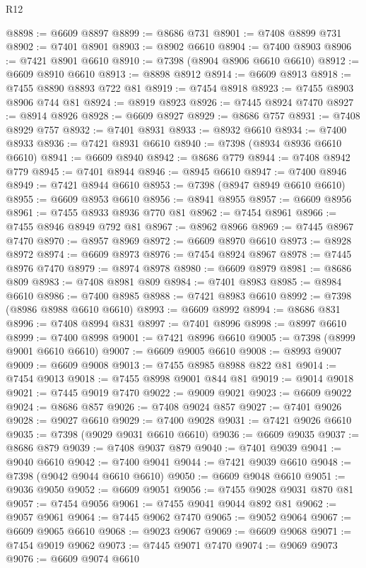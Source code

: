 \begin{lexlean}{R12}
\begin{coremodule}
{{{{{{{{{{{{{{{{{{{{{{{{{{{{{{{{{{{{{{{{{{{{{{{{{{{{{{{{{{{{{{{{{{{{{{{{{{{{{{{{{{@8898 := @6609 @8897
@8899 := @8686 @731
@8901 := @7408 @8899 @731
@8902 := @7401 @8901
@8903 := @8902 @6610
@8904 := @7400 @8903
@8906 := @7421 @8901 @6610
@8910 := @7398 (@8904 @8906 @6610 @6610)
@8912 := @6609 @8910 @6610
@8913 := @8898 @8912
@8914 := @6609 @8913
@8918 := @7455 @8890 @8893 @722 @81
@8919 := @7454 @8918
@8923 := @7455 @8903 @8906 @744 @81
@8924 := @8919 @8923
@8926 := @7445 @8924 @7470
@8927 := @8914 @8926
@8928 := @6609 @8927
@8929 := @8686 @757
@8931 := @7408 @8929 @757
@8932 := @7401 @8931
@8933 := @8932 @6610
@8934 := @7400 @8933
@8936 := @7421 @8931 @6610
@8940 := @7398 (@8934 @8936 @6610 @6610)
@8941 := @6609 @8940
@8942 := @8686 @779
@8944 := @7408 @8942 @779
@8945 := @7401 @8944
@8946 := @8945 @6610
@8947 := @7400 @8946
@8949 := @7421 @8944 @6610
@8953 := @7398 (@8947 @8949 @6610 @6610)
@8955 := @6609 @8953 @6610
@8956 := @8941 @8955
@8957 := @6609 @8956
@8961 := @7455 @8933 @8936 @770 @81
@8962 := @7454 @8961
@8966 := @7455 @8946 @8949 @792 @81
@8967 := @8962 @8966
@8969 := @7445 @8967 @7470
@8970 := @8957 @8969
@8972 := @6609 @8970 @6610
@8973 := @8928 @8972
@8974 := @6609 @8973
@8976 := @7454 @8924 @8967
@8978 := @7445 @8976 @7470
@8979 := @8974 @8978
@8980 := @6609 @8979
@8981 := @8686 @809
@8983 := @7408 @8981 @809
@8984 := @7401 @8983
@8985 := @8984 @6610
@8986 := @7400 @8985
@8988 := @7421 @8983 @6610
@8992 := @7398 (@8986 @8988 @6610 @6610)
@8993 := @6609 @8992
@8994 := @8686 @831
@8996 := @7408 @8994 @831
@8997 := @7401 @8996
@8998 := @8997 @6610
@8999 := @7400 @8998
@9001 := @7421 @8996 @6610
@9005 := @7398 (@8999 @9001 @6610 @6610)
@9007 := @6609 @9005 @6610
@9008 := @8993 @9007
@9009 := @6609 @9008
@9013 := @7455 @8985 @8988 @822 @81
@9014 := @7454 @9013
@9018 := @7455 @8998 @9001 @844 @81
@9019 := @9014 @9018
@9021 := @7445 @9019 @7470
@9022 := @9009 @9021
@9023 := @6609 @9022
@9024 := @8686 @857
@9026 := @7408 @9024 @857
@9027 := @7401 @9026
@9028 := @9027 @6610
@9029 := @7400 @9028
@9031 := @7421 @9026 @6610
@9035 := @7398 (@9029 @9031 @6610 @6610)
@9036 := @6609 @9035
@9037 := @8686 @879
@9039 := @7408 @9037 @879
@9040 := @7401 @9039
@9041 := @9040 @6610
@9042 := @7400 @9041
@9044 := @7421 @9039 @6610
@9048 := @7398 (@9042 @9044 @6610 @6610)
@9050 := @6609 @9048 @6610
@9051 := @9036 @9050
@9052 := @6609 @9051
@9056 := @7455 @9028 @9031 @870 @81
@9057 := @7454 @9056
@9061 := @7455 @9041 @9044 @892 @81
@9062 := @9057 @9061
@9064 := @7445 @9062 @7470
@9065 := @9052 @9064
@9067 := @6609 @9065 @6610
@9068 := @9023 @9067
@9069 := @6609 @9068
@9071 := @7454 @9019 @9062
@9073 := @7445 @9071 @7470
@9074 := @9069 @9073
@9076 := @6609 @9074 @6610
}}}}}}}}}}}}}}}}}}}}}}}}}}}}}}}}}}}}}}}}}}}}}}}}}}}}}}}}}}}}}}}}}}}}}}}}}}}}}}}}}}
\end{coremodule}
\end{lexlean}
